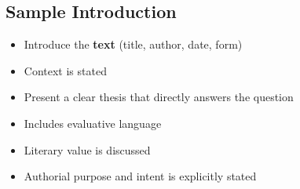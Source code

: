 	\subsection{Sample Introduction}
	
		\begin{itemize}
			\item Introduce the \textbf{text} (title, author, date, form)
			\item Context is stated
			\item Present a clear thesis that directly answers the question
			\item Includes evaluative language
			\item Literary value is discussed
			\item Authorial purpose and intent is explicitly stated
		\end{itemize}
